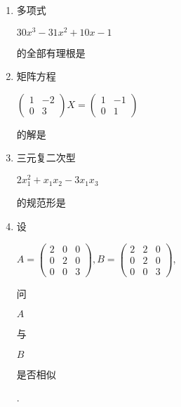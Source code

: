 \documentclass[10pt]{article}
\begin{document}
\begin{enumerate}
  \item \begin{CJK}{UTF8}{mj}多项式\end{CJK} $30 x^{3}-31 x^{2}+10 x-1$ \begin{CJK}{UTF8}{mj}的全部有理根是\end{CJK}

  \item \begin{CJK}{UTF8}{mj}矩阵方程\end{CJK} $\left(\begin{array}{cc}1 & -2 \\ 0 & 3\end{array}\right) X=\left(\begin{array}{cc}1 & -1 \\ 0 & 1\end{array}\right)$ \begin{CJK}{UTF8}{mj}的解是\end{CJK}

  \item \begin{CJK}{UTF8}{mj}三元复二次型\end{CJK} $2 x_{1}^{2}+x_{1} x_{2}-3 x_{1} x_{3}$ \begin{CJK}{UTF8}{mj}的规范形是\end{CJK}

  \item \begin{CJK}{UTF8}{mj}设\end{CJK} $A=\left(\begin{array}{lll}2 & 0 & 0 \\ 0 & 2 & 0 \\ 0 & 0 & 3\end{array}\right), B=\left(\begin{array}{lll}2 & 2 & 0 \\ 0 & 2 & 0 \\ 0 & 0 & 3\end{array}\right)$, \begin{CJK}{UTF8}{mj}问\end{CJK} $A$ \begin{CJK}{UTF8}{mj}与\end{CJK} $B$ \begin{CJK}{UTF8}{mj}是否相似\end{CJK}.


\end{enumerate}
\end{document}
